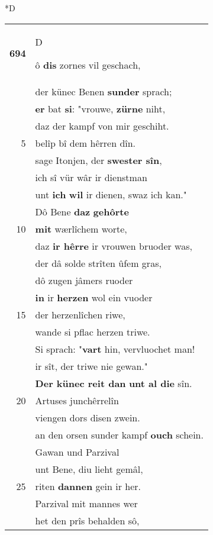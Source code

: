 \documentclass[8pt,a4paper,notitlepage]{article}
\begin{document}
\begin{table}[ht]
\begin{minipage}[t]{0.5\linewidth}
\small
\begin{center}*D
\end{center}
\begin{tabular}{rl}
\textbf{694} & \begin{large}D\end{large}ô \textbf{dis} zornes vil geschach,\\ 
 & der künec Benen \textbf{sunder} sprach;\\ 
 & \textbf{er} bat \textbf{si}: "vrouwe, \textbf{zürne} niht,\\ 
 & daz der kampf von mir geschiht.\\ 
5 & belîp bî dem hêrren dîn.\\ 
 & sage Itonjen, der \textbf{swester sîn},\\ 
 & ich sî vür wâr ir dienstman\\ 
 & unt \textbf{ich} \textbf{wil} ir dienen, swaz ich kan."\\ 
 & Dô Bene \textbf{daz} \textbf{gehôrte}\\ 
10 & \textbf{mit} wærlîchem worte,\\ 
 & daz \textbf{ir hêrre} ir vrouwen bruoder was,\\ 
 & der dâ solde strîten ûfem gras,\\ 
 & dô zugen jâmers ruoder\\ 
 & \textbf{in} ir \textbf{herzen} wol ein vuoder\\ 
15 & der herzenlîchen riwe,\\ 
 & wande si pflac herzen triwe.\\ 
 & Si sprach: "\textbf{vart} hin, vervluochet man!\\ 
 & ir sît, der triwe nie gewan."\\ 
 & \textbf{Der künec reit dan} \textbf{unt al die} sîn.\\ 
20 & Artuses junchêrrelîn\\ 
 & viengen dors disen zwein.\\ 
 & an den orsen sunder kampf \textbf{ouch} schein.\\ 
 & Gawan und Parzival\\ 
 & unt Bene, diu lieht gemâl,\\ 
25 & riten \textbf{dannen} gein ir her.\\ 
 & Parzival mit mannes wer\\ 
 & het den prîs behalden sô,\\ 

\end{tabular}
\end{minipage}
\end{table}
\end{document}
